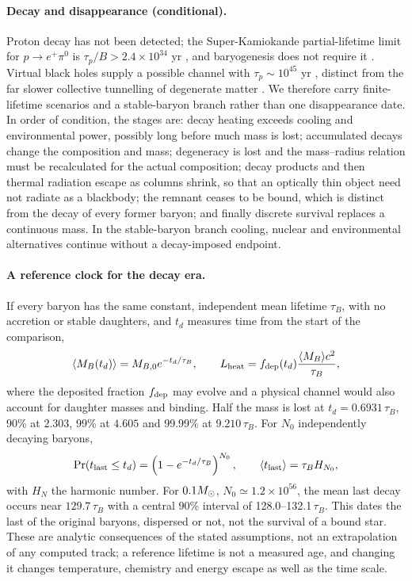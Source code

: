 \paragraph{Decay and disappearance (conditional).}
Proton decay has not been detected; the Super-Kamiokande partial-lifetime
limit for $p\rightarrow e^+\pi^0$ is $\tau_p/B>2.4\times10^{34}$ yr
\cite{takenaka20}, and baryogenesis does not require it \cite{fukugita86}.
Virtual black holes supply a possible channel with
$\tau_p\sim10^{45}$ yr \cite{adams01}, distinct from the far slower
collective tunnelling of degenerate matter \cite{adams98}. We therefore
carry finite-lifetime scenarios and a stable-baryon branch rather than one
disappearance date. In order of condition, the stages are: decay heating
exceeds cooling and environmental power, possibly long before much mass is
lost; accumulated decays change the composition and mass; degeneracy is
lost and the mass--radius relation must be recalculated for the actual
composition; decay products and then thermal radiation escape as columns
shrink, so that an optically thin object need not radiate as a blackbody;
the remnant ceases to be bound, which is distinct from the decay of every
former baryon; and finally discrete survival replaces a continuous mass. In
the stable-baryon branch cooling, nuclear and environmental alternatives
continue without a decay-imposed endpoint.

\paragraph{A reference clock for the decay era.}
If every baryon has the same constant, independent mean lifetime $\tau_B$,
with no accretion or stable daughters, and $t_d$ measures time from the
start of the comparison,
\begin{equation}
 \langle M_B(t_d)\rangle=M_{B,0}e^{-t_d/\tau_B},\qquad
 L_{\rm heat}=f_{\rm dep}(t_d)\frac{\langle M_B\rangle c^2}{\tau_B},
\end{equation}
where the deposited fraction $f_{\rm dep}$ may evolve and a physical channel
would also account for daughter masses and binding. Half the mass is lost at
$t_d=0.6931\,\tau_B$, 90\% at $2.303$, 99\% at $4.605$ and 99.99\% at
$9.210\,\tau_B$. For $N_0$ independently decaying baryons,
\begin{equation}
 \Pr(t_{\rm last}\leq t_d)=\left(1-e^{-t_d/\tau_B}\right)^{N_0},\qquad
 \langle t_{\rm last}\rangle=\tau_B H_{N_0},
\end{equation}
with $H_N$ the harmonic number. For $0.1M_\odot$, $N_0\simeq1.2\times10^{56}$,
the mean last decay occurs near $129.7\,\tau_B$ with a central 90\% interval
of 128.0--132.1$\,\tau_B$. This dates the last of the original baryons,
dispersed or not, not the survival of a bound star. These are analytic
consequences of the stated assumptions, not an extrapolation of any
computed track; a reference lifetime is not a measured age, and changing it
changes temperature, chemistry and energy escape as well as the time scale.
